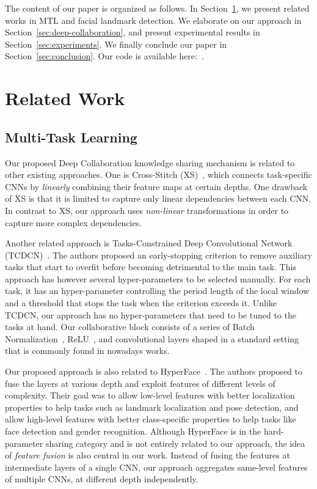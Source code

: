 \documentclass[runningheads]{llncs}
\newcommand{\citep}{\cite}
\begin{document}
The content of our paper is organized as follows. In Section~\ref{sec:related-work}, we present related works in MTL and facial landmark detection. We elaborate on our approach in Section~\ref{sec:deep-collaboration}, and present experimental results in Section~\ref{sec:experiments}. We finally conclude our paper in Section~\ref{sec:conclusion}. Our code is available here:~\citep{trottier2018DeepCollaborationGithub}. 


\section{Related Work}
\label{sec:related-work}

\subsection{Multi-Task Learning}
\label{ssec:related-work-mtl}

Our proposed Deep Collaboration knowledge sharing mechanism is related to other existing approaches. One is Cross-Stitch (XS)~\citep{misra2016cross}, which connects task-specific CNNs by \emph{linearly} combining their feature maps at certain depths. One drawback of XS is that it is limited to capture only linear dependencies between each CNN. In contrast to XS, our approach uses \emph{non-linear} transformations in order to capture more complex dependencies. 

Another related approach is Tasks-Constrained Deep Convolutional Network (TCDCN)~\citep{zhang2014facial}. The authors proposed an early-stopping criterion to remove auxiliary tasks that start to overfit before becoming detrimental to the main task. This approach has however several hyper-parameters to be selected manually. For each task, it has an hyper-parameter controlling the period length of the local window and a threshold that stops the task when the criterion exceeds it. Unlike TCDCN, our approach has no hyper-parameters that need to be tuned to the tasks at hand. Our collaborative block consists of a series of Batch Normalization~\citep{ioffe2015batch}, ReLU~\citep{nair2010rectified}, and convolutional layers shaped in a standard setting that is commonly found in nowadays works. 

Our proposed approach is also related to HyperFace~\citep{ranjan2016hyperface}. The authors proposed to fuse the layers at various depth and exploit features of different levels of complexity. Their goal was to allow low-level features with better localization properties to help tasks such as landmark localization and pose detection, and allow high-level features with better class-specific properties to help tasks like face detection and gender recognition. Although HyperFace is in the hard-parameter sharing category and is not entirely related to our approach, the idea of \textit{feature fusion} is also central in our work. Instead of fusing the features at intermediate layers of a single CNN, our approach aggregates same-level features of multiple CNNs, at different depth independently.
\end{document}
